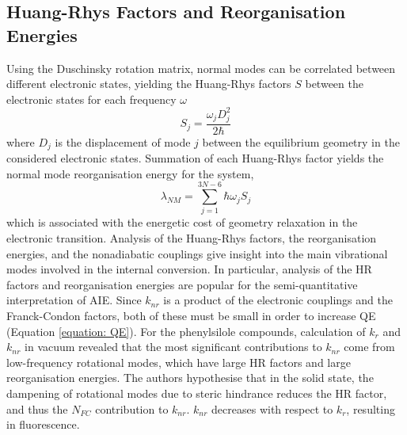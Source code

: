 \subsection{Huang-Rhys Factors and Reorganisation Energies}\label{section: lom HR}
Using the Duschinsky rotation matrix, normal modes can be correlated between different electronic states, yielding the Huang-Rhys factors $S$ between the electronic states for each frequency $\omega$
\begin{equation}
S_{j}=\frac{\omega_{j}D_{j}^2}{2\hbar{}}
\end{equation}
where $D_{j}$ is the displacement of mode $j$ between the equilibrium geometry in the considered electronic states. Summation of each Huang-Rhys factor yields the normal mode reorganisation energy for the system,
\begin{equation}
\lambda_{NM}=\sum_{j=1}^{3N-6}\hbar{}\omega_{j}S_{j}
\end{equation}
which is associated with the energetic cost of geometry relaxation in the electronic transition. Analysis of the Huang-Rhys factors, the reorganisation energies, and the nonadiabatic couplings give insight into the main vibrational modes involved in the internal conversion. In particular, analysis of the HR factors and reorganisation energies are popular for the semi-quantitative interpretation of AIE.\cite{Yin2006,Peng2007,Li2011,Peng2013,Shuai2014c,Shuai2014,Wu2014,Zhang2015a,Zheng2016,Fan2016,Zhang2016,Duan2017,Fan2017,Fan2018} Since $k_{nr}$ is a product of the electronic couplings and the Franck-Condon factors, both of these must be small in order to increase \ac{QE} (Equation \ref{equation: QE}). For the phenylsilole compounds, calculation of $k_{r}$ and $k_{nr}$ in vacuum revealed that the most significant contributions to $k_{nr}$ come from low-frequency rotational modes, which have large \ac{HR} factors and large reorganisation energies. The authors hypothesise that in the solid state, the dampening of rotational modes due to steric hindrance reduces the \ac{HR} factor, and thus the $N_{FC}$ contribution to $k_{nr}$.\cite{Yui2005,Yin2006} $k_{nr}$ decreases with respect to $k_{r}$, resulting in fluorescence.


